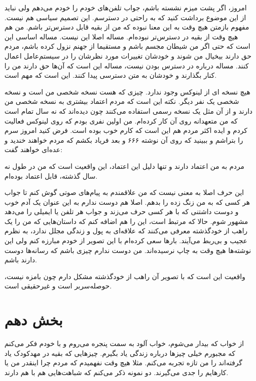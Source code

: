 امروز، اگر پشت میزم نشسته باشم، جواب تلفن‌های خودم را خودم می‌دهم ولی
نباید از این موضوع برداشت کنید که به راحتی در دسترسم. این تصمیم سیاسی
هم نیست. مفهوم بازمتن هیچ وقت به این معنا نبوده که من از بقیه قابل
دسترس‌تر باشم. من هم هیچ وقت از بقیه در دسترس‌تر نبوده‌ام. مساله اصلا این
نیست. مساله اساسی این است که حتی اگر من شیطان مجسم باشم و مستقیما از
جهنم نزول کرده باشم، مردم حق دارند بیخیال من شوند و خودشان تغییرات
مورد نظرشان را در سیستم‌عامل اعمال کنند. مساله درباره در دسترس بودن
نیست، مساله این است که آن‌ها حق دارند من را کنار بگذارند و خودشان به متن
دسترسی پیدا کنند. این است که مهم است.

هیچ نسخه ای از لینوکس وجود ندارد. چیزی که هست نسخه شخصی
من است و نسخه شخصی یک نفر دیگر. نکته این است که مردم اعتماد بیشتری به
نسخه شخصی من دارند و از آن مثل یک نسخه رسمی استفاده می‌کنند چون دیده‌اند
که نه سال تمام است که من متعهدانه روی آن کار کرده‌ام. من اولین نفری
بودم که روی لینوکس فعالیت کردم و ایده اکثر مردم هم این است که کارم خوب
بوده است. فرض کنید امروز سرم را بتراشم و ببینید که روی آن نوشته
۶۶۶ و بعد
فریاد بکشم که 
مردم خواهند خندید و عده‌ای خواهند گفت: 

مردم به من اعتماد دارند و تنها دلیل این اعتماد، این واقعیت است که من
در طول نه سال گذشته، قابل اعتماد بوده‌ام.

این حرف اصلا به معنی نیست که من علاقمندم به پیام‌های صوتی گوش کنم تا
جواب هر کسی که به من زنگ زده را بدهم. اصلا هم دوست ندارم به این عنوان
یک آدم خوب و دوست داشتنی که با هر کسی حرف می‌زند و جواب هر تلفن یا
ایمیلی را می‌دهد مشهور شوم. حالا که مرتبط است، این را هم اضافه کنم که
داستان‌هایی که من را یک راهب از خودگذشته معرفی می‌کنند که علاقه‌ای به پول
و زندگی مجلل ندارد، به نظرم عجیب و بی‌ربط می‌آیند. بارها سعی کرده‌ام با
این تصویر از خودم مبارزه کنم ولی این نوشته‌ها هیچ وقت به چاپ
نرسیده‌اند. من دوست ندارم چیزی باشم که رسانه‌ها دوست دارند باشم.

واقعیت این است که با تصویر آن راهب از خودگذشته مشکل دارم چون بامزه
نیست، حوصله‌سربر است و غیرحقیقی است.

\section{بخش دهم}
از خواب که بیدار می‌شوم، خواب آلود به سمت پنجره می‌روم و با خودم فکر
می‌کنم که مجبورم خیلی چیزها درباره زندگی یاد بگیرم. چیزهایی که بقیه در
مهدکودک یاد گرفته‌اند را من تازه تجربه می‌کنم. مثلا هیچ وقت نفهمیدم که
مردم چرا اینقدر من یا کارهایم را جدی می‌گیرند. دو نمونه ذکر می‌کنم که
شباهت‌هایی هم با هم دارند.

